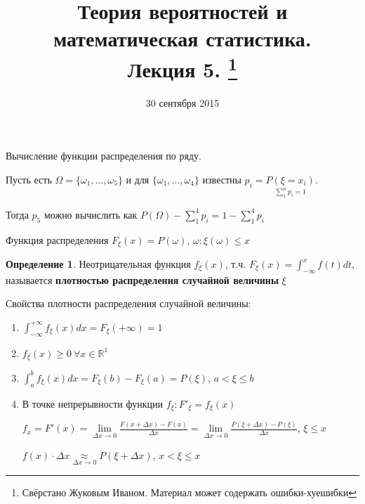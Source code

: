 \documentclass[a4paper, 12pt]{article}
\title{Теория вероятностей и математическая статистика.\\Лекция 5.
    \footnote{Свёрстано Жуковым Иваном. Материал может содержать ошибки-хуешибки}}
\author{}
\date{30 сентября 2015}
\theoremstyle{definition}
\newtheorem{Definition}{Определение}
\begin{document}
    \maketitle

    \begin{center}
        Вычисление функции распределения по ряду.
    \end{center}

    Пусть есть \(\Omega = \{\omega_1, \ldots, \omega_5\}\) и для \(\{\omega_1, \ldots, \omega_4\}\) известны
    \(p_i = \underset{\sum^{n}_{1} p_i = 1}{P(\xi = x_i)}\).

    Тогда \(p_5\) можно вычислить как \(P(\Omega) - \sum^{4}_{1}p_i = 1 - \sum^{4}_{1}p_i\) 

    Функция распределения \(F_{\xi}(x) = P(\omega)\), \( \omega: \xi(\omega) \le x \)



    \begin{Definition}
        Неотрицательная функция \(f_{\xi}(x)\), т.ч. \(F_{\xi}(x) = \int^{x}_{-
        \infty} f(t) dt\), называется \textbf{плотностью распределения случайной величины} \(\xi\)
    \end{Definition}

    \begin{center}
        Свойства плотности распределения случайной величины:
        \begin{enumerate}
            \item
                \(\int^{+\infty}_{-\infty} f_{\xi}(x)dx = F_{\xi}(+\infty) = 1\)
            \item
                \(f_{\xi}(x) \ge 0 \ \forall x \in \mathbb{R}^1\)
            \item
                \(\int^{b}_{a} f_{\xi}(x)dx = F_{\xi}(b) - F_{\xi}(a) = P(\xi)\), \(a < \xi \le b\) 
            \item
                В точке непрерывности функции \(f_{\xi}: F'_{\xi} = f_{\xi}(x)\)

                \(f_x = F'(x) = \underset{\Delta x \rightarrow 0}{\lim} \frac{F(x + \Delta x) - F(x)}{\Delta x} = 
                \underset{\Delta x \rightarrow 0}{\lim} \frac{P(\xi + \Delta x) - P(\xi)}{\Delta x}\), \(\xi \le x\)

                \(f(x) \cdot \Delta x \underset{\Delta x \rightarrow 0}{\approx} P(\xi + \Delta x)\), \(x < \xi \le x\) 
        \end{enumerate}
    \end{center}
\end{document}
